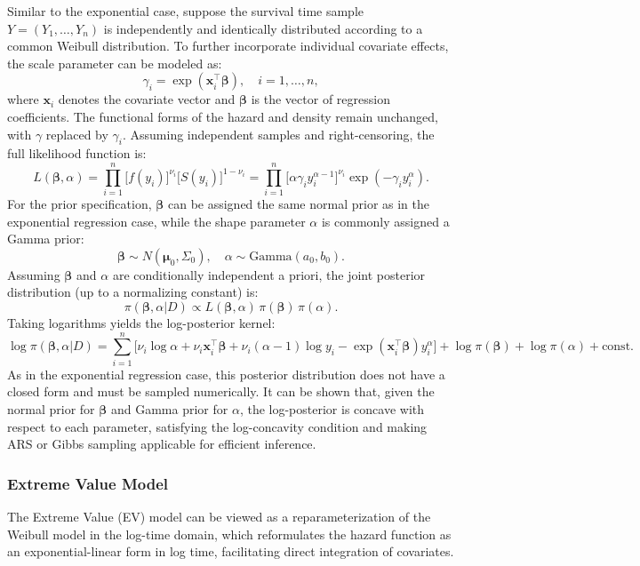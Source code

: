 Similar to the exponential case, suppose the survival time sample $Y = (Y_1, \ldots, Y_n)$ is independently and identically distributed according to a common Weibull distribution. To further incorporate individual covariate effects, the scale parameter can be modeled as:
$$
\gamma_i = \exp(\mathbf{x}_i^\top \boldsymbol{\beta}),
\quad i = 1, \ldots, n,
$$
where $\mathbf{x}_i$ denotes the covariate vector and $\boldsymbol{\beta}$ is the vector of regression coefficients. The functional forms of the hazard and density remain unchanged, with $\gamma$ replaced by $\gamma_i$.
Assuming independent samples and right-censoring, the full likelihood function is:
$$
L(\boldsymbol{\beta}, \alpha)
= \prod_{i=1}^n 
\big[ f(y_i) \big]^{\nu_i} 
\big[ S(y_i) \big]^{1 - \nu_i}
= \prod_{i=1}^n 
\big[ \alpha \gamma_i y_i^{\alpha - 1} \big]^{\nu_i} 
\exp(-\gamma_i y_i^\alpha).
$$
For the prior specification, $\boldsymbol{\beta}$ can be assigned the same normal prior as in the exponential regression case, while the shape parameter $\alpha$ is commonly assigned a Gamma prior:
$$
\boldsymbol{\beta} \sim N(\boldsymbol{\mu}_0, \Sigma_0), 
\quad 
\alpha \sim \text{Gamma}(a_0, b_0).
$$
Assuming $\boldsymbol{\beta}$ and $\alpha$ are conditionally independent a priori, the joint posterior distribution (up to a normalizing constant) is:
$$
\pi(\boldsymbol{\beta}, \alpha | D)
\propto L(\boldsymbol{\beta}, \alpha)
\, \pi(\boldsymbol{\beta})
\, \pi(\alpha).
$$
Taking logarithms yields the log-posterior kernel:
$$
\log \pi(\boldsymbol{\beta}, \alpha | D)
= \sum_{i=1}^n 
\big[
\nu_i \log \alpha + \nu_i \mathbf{x}_i^\top \boldsymbol{\beta} 
+ \nu_i (\alpha - 1) \log y_i 
- \exp(\mathbf{x}_i^\top \boldsymbol{\beta}) y_i^\alpha
\big]
+ \log \pi(\boldsymbol{\beta}) + \log \pi(\alpha) + \text{const}.
$$
As in the exponential regression case, this posterior distribution does not have a closed form and must be sampled numerically. It can be shown that, given the normal prior for $\boldsymbol{\beta}$ and Gamma prior for $\alpha$, the log-posterior is concave with respect to each parameter, satisfying the log-concavity condition and making ARS or Gibbs sampling applicable for efficient inference.

\subsubsection{Extreme Value Model}
The Extreme Value (EV) model can be viewed as a reparameterization of the Weibull model in the log-time domain, which reformulates the hazard function as an exponential-linear form in log time, facilitating direct integration of covariates.

